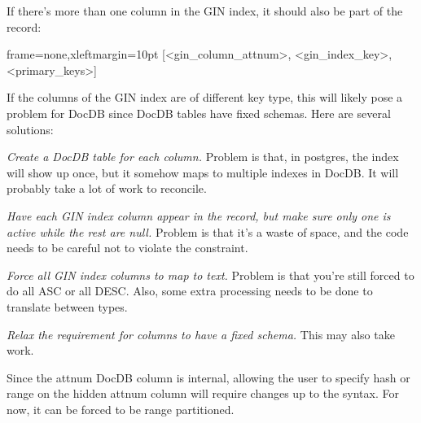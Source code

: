 If there's more than one column in the GIN index, it should also be part of the
record:

\begin{textcode*}{frame=none,xleftmargin=10pt}
[<gin_column_attnum>, <gin_index_key>, <primary_keys>]
\end{textcode*}

If the columns of the GIN index are of different key type, this will likely
pose a problem for DocDB since DocDB tables have fixed schemas.  Here are
several solutions:

\begin{oparts}
\item
  \emph{Create a DocDB table for each column.}  Problem is that, in postgres,
  the index will show up once, but it somehow maps to multiple indexes in
  DocDB.  It will probably take a lot of work to reconcile.
\item
  \emph{Have each GIN index column appear in the record, but make sure only one
  is active while the rest are null.}  Problem is that it's a waste of space,
  and the code needs to be careful not to violate the constraint.
\item
  \emph{Force all GIN index columns to map to text.}  Problem is that you're
  still forced to do all ASC or all DESC.  Also, some extra processing needs to
  be done to translate between types.
\item
  \emph{Relax the requirement for columns to have a fixed schema.}  This may
  also take work.
\end{oparts}

Since the attnum DocDB column is internal, allowing the user to specify hash or
range on the hidden attnum column will require changes up to the syntax.  For
now, it can be forced to be range partitioned.
